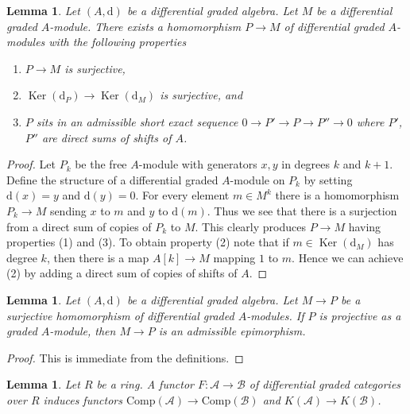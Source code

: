 \documentclass{stacks-project}
\theoremstyle{plain}
\newtheorem{lemma}[subsection]{Lemma}
\theoremstyle{definition}
\theoremstyle{remark}
\numberwithin{equation}{subsection}
\def\Ker{\mathop{\mathrm{Ker}}}
\begin{document}
\begin{lemma}
\label{lemma-good-quotient}
Let $(A, \text{d})$ be a differential graded algebra.
Let $M$ be a differential graded $A$-module. There exists a homomorphism
$P \to M$ of differential graded $A$-modules with the following
properties
\begin{enumerate}
\item $P \to M$ is surjective,
\item $\Ker(\text{d}_P) \to \Ker(\text{d}_M)$ is surjective, and
\item $P$ sits in an admissible short exact sequence
$0 \to P' \to P \to P'' \to 0$ where $P'$, $P''$ are direct sums
of shifts of $A$.
\end{enumerate}
\end{lemma}

\begin{proof}
Let $P_k$ be the free $A$-module with generators $x, y$ in degrees
$k$ and $k + 1$. Define the structure of a differential graded
$A$-module on $P_k$ by setting $\text{d}(x) = y$ and $\text{d}(y) = 0$.
For every element $m \in M^k$ there is a homomorphism
$P_k \to M$ sending $x$ to $m$ and $y$ to $\text{d}(m)$.
Thus we see that there is a surjection from a direct sum
of copies of $P_k$ to $M$. This clearly produces $P \to M$
having properties (1) and (3). To obtain property (2) note
that if $m \in \Ker(\text{d}_M)$ has degree $k$, then there is a map
$A[k] \to M$ mapping $1$ to $m$. Hence we can achieve (2) by adding
a direct sum of copies of shifts of $A$.
\end{proof}

\begin{lemma}
\label{lemma-target-graded-projective}
Let $(A, \text{d})$ be a differential graded algebra.
Let $M \to P$ be a surjective homomorphism of differential graded
$A$-modules. If $P$ is projective as a graded $A$-module, then
$M \to P$ is an admissible epimorphism.
\end{lemma}

\begin{proof}
This is immediate from the definitions.
\end{proof}

\begin{lemma}
\label{lemma-functorial}
Let $R$ be a ring. A functor $F : \mathcal{A} \to \mathcal{B}$
of differential graded categories over $R$ induces functors
$\text{Comp}(\mathcal{A}) \to \text{Comp}(\mathcal{B})$
and $K(\mathcal{A}) \to K(\mathcal{B})$.
\end{lemma}
\end{document}
